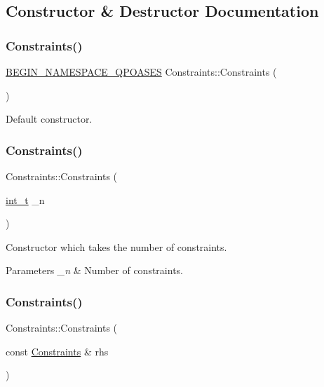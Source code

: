 \subsection{Constructor \& Destructor Documentation}
\mbox{\label{class_constraints_a9c677de63278cf243c9a9d9afcfd0877}} 
\subsubsection{\texorpdfstring{Constraints()}{Constraints()}\hspace{0.1cm}{\footnotesize\ttfamily [1/3]}}
{\footnotesize\ttfamily \hyperlink{_types_8hpp_afd127fcb3c8f47975e9fa0ec2bacde52}{B\+E\+G\+I\+N\+\_\+\+N\+A\+M\+E\+S\+P\+A\+C\+E\+\_\+\+Q\+P\+O\+A\+S\+ES} Constraints\+::\+Constraints (\begin{DoxyParamCaption}{ }\end{DoxyParamCaption})}

Default constructor. \mbox{\label{class_constraints_ae89609d265bd2b331b23f44ee8de4ce7}} 
\subsubsection{\texorpdfstring{Constraints()}{Constraints()}\hspace{0.1cm}{\footnotesize\ttfamily [2/3]}}
{\footnotesize\ttfamily Constraints\+::\+Constraints (\begin{DoxyParamCaption}\item[{\hyperlink{_types_8hpp_ab6fd6105e64ed14a0c9281326f05e623}{int\+\_\+t}}]{\+\_\+n }\end{DoxyParamCaption})}

Constructor which takes the number of constraints. 
\begin{DoxyParams}{Parameters}
{\em \+\_\+n} & Number of constraints. \\
\hline
\end{DoxyParams}
\mbox{\label{class_constraints_aeb433ff1018134588275911c6acf0f8e}} 
\subsubsection{\texorpdfstring{Constraints()}{Constraints()}\hspace{0.1cm}{\footnotesize\ttfamily [3/3]}}
{\footnotesize\ttfamily Constraints\+::\+Constraints (\begin{DoxyParamCaption}\item[{const \hyperlink{class_constraints}{Constraints} \&}]{rhs }\end{DoxyParamCaption})}

